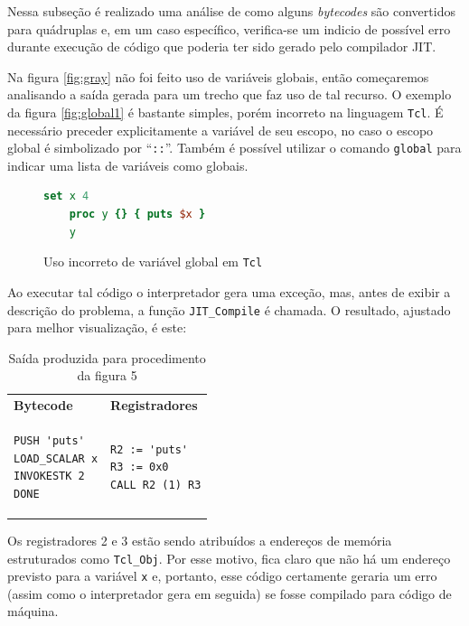 Nessa subseção é realizado uma análise de como alguns
\textit{bytecodes} são convertidos para quádruplas e, em um caso
específico, verifica-se um indicio de possível erro durante execução
de código que poderia ter sido gerado pelo compilador JIT.

Na figura \ref{fig:gray} não foi feito uso de variáveis globais, então
começaremos analisando a saída gerada para um trecho que faz uso de
tal recurso. O exemplo da figura \ref{fig:global1} é bastante simples,
porém incorreto na linguagem \texttt{Tcl}. É necessário preceder
explicitamente a variável de seu escopo, no caso o escopo global é
simbolizado por ``\verb!::!''. Também é possível utilizar o comando
\verb!global! para indicar uma lista de variáveis como globais.

\begin{figure}[h]
  \centering
  \begin{lstlisting}[language=Tcl]
    set x 4
    proc y {} { puts $x }
    y
  \end{lstlisting}
  \caption{Uso incorreto de variável global em
    \texttt{Tcl} \label{fig:global1}}
\label{xx$xx}
\end{figure}

Ao executar tal código o interpretador gera uma exceção, mas, antes de
exibir a descrição do problema, a função \verb!JIT_Compile! é
chamada. O resultado, ajustado para melhor visualização, é este:

\begin{table}[h]
  \centering
  \caption{Saída produzida para procedimento da figura 5}
  \begin{tabular}{| p{4cm} | p{4cm} |}
    \hline
    \bf{Bytecode} & \bf{Registradores} \\
\begin{verbatim}
PUSH 'puts'
LOAD_SCALAR x
INVOKESTK 2
DONE
\end{verbatim} &
\begin{verbatim}
R2 := 'puts'
R3 := 0x0
CALL R2 (1) R3
\end{verbatim} \\
    \hline
  \end{tabular}
\end{table}

Os registradores 2 e 3 estão sendo atribuídos a endereços de memória
estruturados como \verb!Tcl_Obj!. Por esse motivo, fica claro que não
há um endereço previsto para a variável \verb!x! e, portanto, esse
código certamente geraria um erro (assim como o interpretador gera em
seguida) se fosse compilado para código de máquina.%

